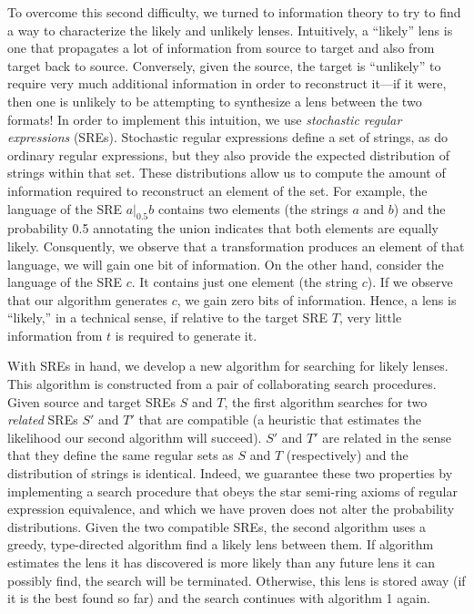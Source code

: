 \documentclass[acmsmall,screen,anonymous]{acmart}
\begin{document}
To overcome this second difficulty, we turned to information theory
to try to find a way to characterize the likely and unlikely lenses.  Intuitively, a ``likely'' lens
is one that propagates a lot of information from source to target and also from target
back to source.  Conversely, given the source, the target is ``unlikely'' to require very much
additional information in order to reconstruct it---if it were, then one is unlikely to
be attempting to synthesize a lens between the two formats!  In order to implement
this intuition, we use \emph{stochastic regular expressions} (SREs).
Stochastic regular expressions define a set of strings, as do ordinary regular expressions,
but they also provide the expected distribution of strings within that set.  These
distributions allow us to compute the amount of information required to reconstruct
an element of the set.  For example, the language of the SRE $a |_{0.5} b$ contains two elements
(the strings $a$ and $b$) and the probability 0.5 annotating the union indicates that both
elements are equally likely.  Consquently, we observe that a transformation produces
an element of that language,
we will gain one bit of information.  On the other hand, consider the language of the SRE $c$.
It contains just one element (the string $c$).  If we observe that our algorithm
generates $c$, we gain zero bits of information.
Hence, a lens is ``likely,'' in a technical sense, if relative to the target SRE $T$,
very little information from $t$ is required to generate it. 

With SREs in hand, we develop a new algorithm for searching for likely lenses.
This algorithm is constructed from a pair of collaborating search procedures.
Given source and target SREs $S$ and $T$, the first algorithm searches for two \emph{related} SREs
$S'$ and $T'$ that are compatible (a heuristic that estimates the likelihood
our second algorithm will succeed).  $S'$ and $T'$ are related in the sense
that they define the same regular sets as $S$ and $T$ (respectively) and the distribution
of strings is identical.  Indeed, we guarantee these two properties by implementing
a search procedure that obeys the star semi-ring axioms of regular expression equivalence,
and which we have proven does not alter the probability distributions.
Given the two compatible SREs,
the second algorithm uses a greedy, type-directed algorithm find a likely lens between them.
If algorithm estimates the lens it has discovered is more likely than
any future lens it can possibly find, the search will be terminated.  Otherwise,
this lens is stored away (if it is the best found so far) and the search continues with
algorithm 1 again.
\end{document}
